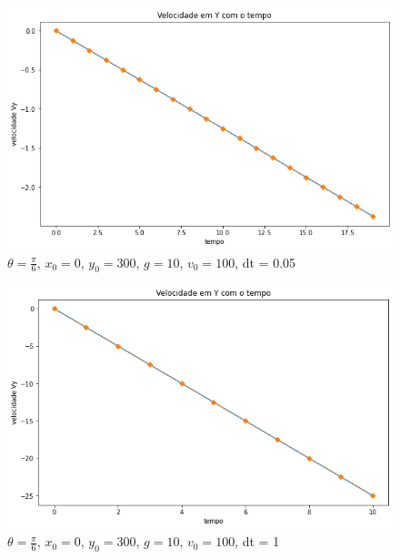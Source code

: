 \documentclass[12pt]{article}
\begin{document}
\begin{figure}[H]
  \centering
  \includegraphics[scale = 0.6]{imagens/(blocoemrampa)velocidadeydt=0.05tf=1.png}
  \caption{$\theta = \frac{\pi}{6}$, $x_0 = 0$, $y_0 = 300$, $g = 10$, $v_0 = 100$, dt = 0.05}
\end{figure}
\begin{figure}[H]
  \centering
  \includegraphics[scale = 0.6]{imagens/(blocoemrampa)velocidadeydt=1tf=10.png}
  \caption{$\theta = \frac{\pi}{6}$, $x_0 = 0$, $y_0 = 300$, $g = 10$, $v_0 = 100$, dt = 1}
\end{figure}
\end{document}
